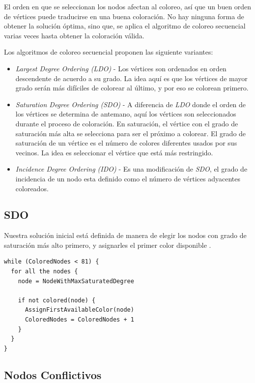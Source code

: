 \documentclass[a4paper,spanish]{article}
\begin{document}
El orden en que se seleccionan los nodos afectan al coloreo, así que un buen orden de
vértices puede traducirse en una buena coloración. No hay ninguna forma de obtener la solución óptima,
sino que, se aplica el algoritmo de coloreo secuencial varias veces hasta obtener la coloración válida.

Los algoritmos de coloreo secuencial proponen las siguiente variantes:

\begin{itemize}
	\item \emph{Largest Degree Ordering (LDO)} - Los vértices son ordenados en orden descendente de acuerdo a su grado. La idea aquí  es que los vértices de mayor grado serán más difíciles de colorear al último, y por eso se colorean primero.
	\item \emph{Saturation Degree Ordering (SDO)} - A diferencia de \emph{LDO} donde el orden de los vértices se determina de antemano, aquí los vértices son seleccionados durante el proceso de coloración. En saturación, el vértice con el grado de saturación más alta se selecciona para ser el próximo a colorear. El grado de saturación de un vértice es el número de colores diferentes usados por sus vecinos. La idea es seleccionar el vértice que está más restringido.
	\item \emph{Incidence Degree Ordering (IDO)} - Es una modificación de \emph{SDO}, el grado de incidencia de un nodo esta definido como el número de vértices adyacentes coloreados.
\end{itemize}
 

\subsection{SDO}

Nuestra solución inicial está definida de manera de elegir los nodos con
grado de saturación más alto primero, y asignarles el primer color disponible \cite{sdo_ldo}.

\begin{Verbatim}[samepage=true]
while (ColoredNodes < 81) {
  for all the nodes {
    node = NodeWithMaxSaturatedDegree

    if not colored(node) {
      AssignFirstAvailableColor(node)
      ColoredNodes = ColoredNodes + 1
    }
  }
}
\end{Verbatim}

\subsection{Nodos Conflictivos}
\end{document}
